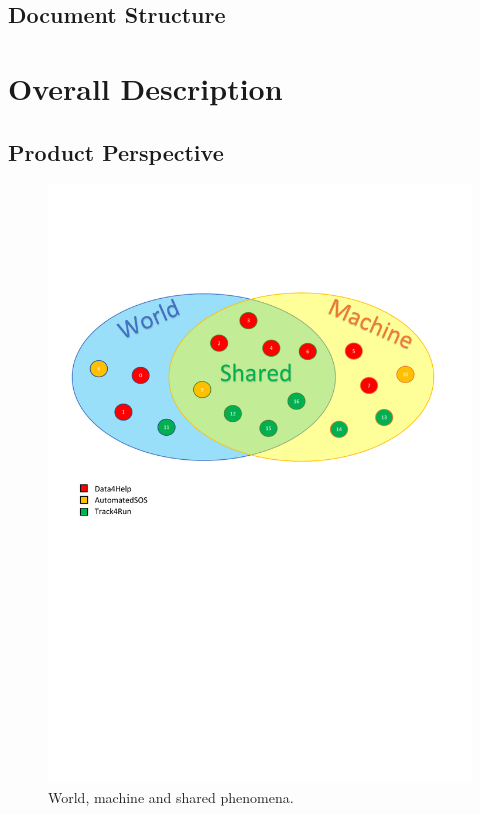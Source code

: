 \documentclass[a4paper]{article}
\begin{document}
    \subsection{Document Structure}
    
    \section{Overall Description}
    
    \subsection{Product Perspective}
    
    \begin{figure}[h!]
        \centering
        \includegraphics[width=\linewidth]{worldMachineShared-small}
        \caption{World, machine and shared phenomena.}
        \label{fig:my_label}
    \end{figure}
    
\end{document}
